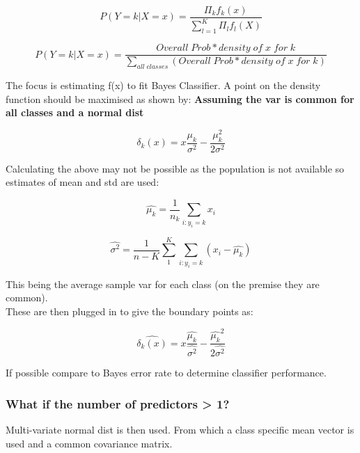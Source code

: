 \documentclass[11pt]{scrartcl} %
\begin{document}
\begin{equation}
	P(Y=k|X=x) = \frac{\Pi_kf_k(x)}{\sum^K_{l=1}{\Pi_lf_l(X)}}
\end{equation}

\begin{equation}
	P(Y=k|X=x) = \frac{Overall\; Prob * density\; of \; x \; for \; k}{\sum_{all\; classes}(Overall\; Prob * density\; of \; x \; for \; k)}
\end{equation}

The focus is estimating f(x) to fit Bayes Classifier. A point on the density function should be maximised as shown by:
\textbf{Assuming the var is common for all classes and a normal dist}

\begin{equation}
	\delta_k(x) = x\frac{\mu_k}{\sigma^2} - \frac{\mu_k^2}{2\sigma^2}
\end{equation}

Calculating the above may not be possible as the population is not available so estimates of mean and std are used:

\begin{equation}
	\hat{\mu_k} = \frac{1}{n_k}\sum_{i:y_i=k}{x_i}
\end{equation}


\begin{equation}
	\hat{\sigma^2}  = \frac{1}{n-K}\sum^K_1\sum_{i:y_i=k}(x_i - \hat{\mu_k})
\end{equation}

This being the average sample var for each class (on the premise they are common).\\

These are then plugged in to give the boundary points as:

\begin{equation}
	\hat{\delta_k(x)} = x\frac{\hat{\mu_k}}{\hat{\sigma^2}} - \frac{\hat{\mu_k}^2}{2\hat{\sigma^2}}
\end{equation}

If possible compare to Bayes error rate to determine classifier performance.

\subsubsection{What if the number of predictors > 1?}

Multi-variate normal dist is then used. From which a class specific mean vector is used and a common covariance matrix.\\
\end{document}
